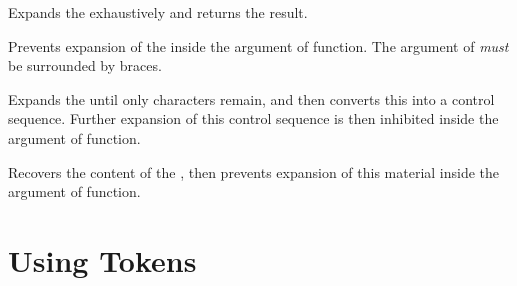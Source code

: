 \documentclass[oneside]{book}
\let\tn=\cs
\begin{document}
\begin{function}{\Expand}
\begin{syntax}
 
\end{syntax}
Expands the  exhaustively and returns the result.
\end{function}

\begin{function}{\UnExpand}
\begin{syntax}
 
\end{syntax}
Prevents expansion of the  inside the argument of  function.
The argument of  \emph{must} be surrounded by braces.
\end{function}

\begin{function}{\OnlyName}
\begin{syntax}
 
\end{syntax}
Expands the  until only characters remain, and then
converts this into a control sequence.
Further expansion of this control sequence is then inhibited
inside the argument of  function.
\end{function}

\begin{function}{\OnlyValue}
\begin{syntax}
 
\end{syntax}
Recovers the content of the , then prevents expansion
of this material inside the argument of  function.
\end{function}

\section{Using Tokens}
\end{document}
